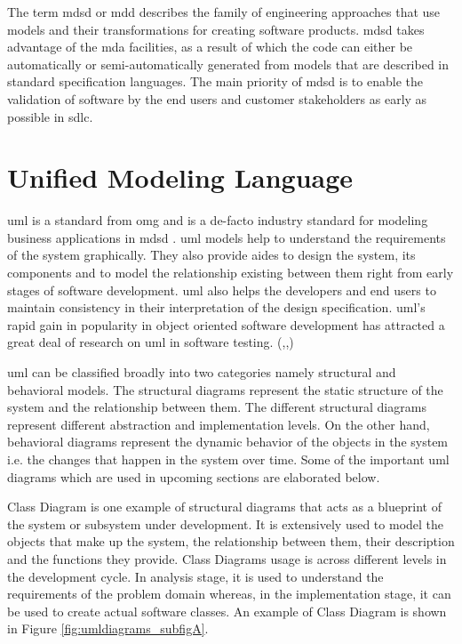 The term \gls{mdsd} or \gls{mdd} describes the family of engineering approaches that use models and their transformations for creating software products. \gls{mdsd} takes advantage of the \gls{mda} facilities, as a result of which the code can either be automatically or semi-automatically generated from models that are described in standard specification languages. The main priority of \gls{mdsd} is to enable the validation of software by the end users and customer stakeholders as early as possible in \gls{sdlc}.



\section{Unified Modeling Language} \label{secuml}
\gls{uml} is a standard from \gls{omg} and is a de-facto industry standard for modeling business applications in \gls{mdsd} \cite{cerny2015separation}. \gls{uml} models help to understand the requirements of the system graphically. They also provide aides to design the system, its components and to model the relationship existing between them right from early stages of software development. \gls{uml} also helps the developers and end users to maintain consistency in their interpretation of the design specification. \gls{uml}’s rapid gain in popularity in object oriented software development has attracted a great deal of research on \gls{uml} in software testing. (\cite{nebut2003requirements},\cite{badri2003use},\cite{nebut2003requirements})

\gls{uml} can be classified broadly into two categories namely structural and behavioral models. The structural diagrams represent the static structure of the system and the relationship between them. The different structural diagrams represent different abstraction and implementation levels. On the other hand, behavioral diagrams represent the dynamic behavior of the objects in the system i.e. the changes that happen in the system over time. Some of the important \gls{uml} diagrams which are used in upcoming sections are elaborated below.

Class Diagram is one example of structural diagrams that acts as a blueprint of the system or subsystem under development. It is extensively used to model the objects that make up the system, the relationship between them, their description and the functions they provide. Class Diagrams usage is across different levels in the development cycle. In analysis stage, it is used to understand the requirements of the problem domain whereas, in the implementation stage, it can be used to create actual software classes. An example of Class Diagram is shown in Figure \ref{fig:umldiagrams_subfigA}.

